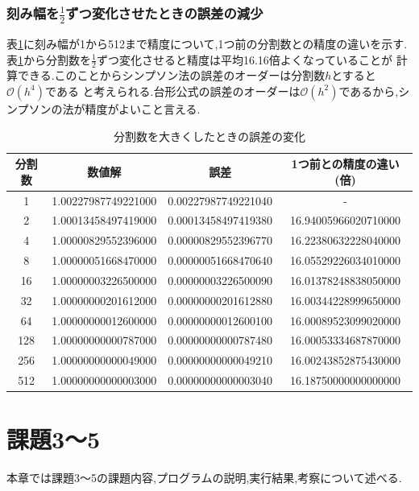 \documentclass[dvipdfmx]{jarticle}
\begin{document}
    \subsubsection{刻み幅を$\frac{1}{2}$ずつ変化させたときの誤差の減少}
    表\ref{error2}に刻み幅が1から512まで精度について,1つ前の分割数との精度の違いを示す.
    表\ref{error2}から分割数を$\frac{1}{2}$ずつ変化させると精度は平均16.16倍よくなっていることが
    計算できる.このことからシンプソン法の誤差のオーダーは分割数$h$とすると$\mathcal{O}(h^4)$である
    と考えられる.台形公式の誤差のオーダーは$\mathcal{O}(h^2)$であるから,シンプソンの法が精度がよいこと言える.
    \begin{table}[H]
      \caption{分割数を大きくしたときの誤差の変化}
    \label{error2}
    \begin{center}
        \begin{tabular}{c|c|c|c}\hline
          分割数 & 数値解 & 誤差 & 1つ前との精度の違い(倍) \\ \hline \hline
          1 & 1.00227987749221000 & 0.00227987749221040 & - \\ 
          2 & 1.00013458497419000 & 0.00013458497419380 & 16.94005966020710000  \\ 
          4 & 1.00000829552396000 & 0.00000829552396770 & 16.22380632228040000  \\ 
          8 & 1.00000051668470000 & 0.00000051668470640 & 16.05529226034010000  \\ 
          16 & 1.00000003226500000 & 0.00000003226500090 & 16.01378248838050000  \\ 
          32 & 1.00000000201612000 & 0.00000000201612880 & 16.00344228999650000  \\ 
          64 & 1.00000000012600000 & 0.00000000012600100 & 16.00089523099020000  \\ 
          128 & 1.00000000000787000 & 0.00000000000787480 & 16.00053334687870000  \\ 
          256 & 1.00000000000049000 & 0.00000000000049210 & 16.00243852875430000  \\ 
          512 & 1.00000000000003000 & 0.00000000000003040 & 16.18750000000000000  \\ \hline
        \end{tabular}
    \end{center}
    \end{table}


    \section{課題3～5}
    本章では課題3～5の課題内容,プログラムの説明,実行結果,考察について述べる.
\end{document}
